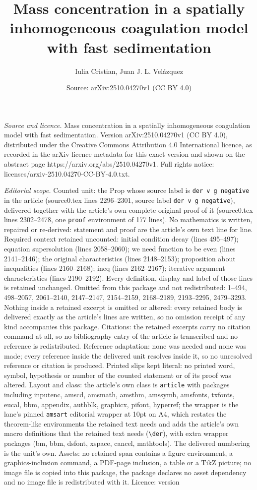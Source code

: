 \documentclass[10pt,a4paper]{amsart}
\title[Mass concentration in a spatially inhomogeneous coagulation ]{Mass concentration in a spatially inhomogeneous coagulation model with fast sedimentation}
\author{Iulia Cristian, Juan J. L. Vel\'azquez}
\date{Source: arXiv:2510.04270v1 (CC BY 4.0)}
\begin{document}
\maketitle

\noindent\emph{Source and licence.} Mass concentration in a spatially inhomogeneous coagulation model with fast sedimentation. Version arXiv:2510.04270v1 (CC BY 4.0), distributed under the Creative Commons Attribution 4.0 International licence, as recorded in the arXiv licence metadata for this exact version and shown on the abstract page https://arxiv.org/abs/2510.04270v1. Full rights notice: licenses/arxiv-2510.04270-CC-BY-4.0.txt.\par\smallskip

\noindent\textit{Editorial scope.} Counted unit: the Prop whose source label is \texttt{der v g negative} in the article (source0.tex lines 2296--2301, source label \texttt{der v g negative}), delivered together with the article's own complete original proof of it (source0.tex lines 2302--2478, one \texttt{proof} environment of 177 lines). No mathematics is written, repaired or re-derived: statement and proof are the article's own text line for line. Required context retained uncounted: initial condition decay (lines 495--497); equation supersolution (lines 2058--2060); we need function to be even (lines 2141--2146); the original characteristics (lines 2148--2153); proposition about inequalities (lines 2160--2168); ineq (lines 2162--2167); iterative argument characteristics (lines 2190--2192). Every definition, display and label of those lines is retained unchanged. Omitted from this package and not redistributed: 1--494, 498--2057, 2061--2140, 2147--2147, 2154--2159, 2168--2189, 2193--2295, 2479--3293. Nothing inside a retained excerpt is omitted or altered: every retained body is delivered exactly as the article's lines are written, so no omission receipt of any kind accompanies this package. Citations: the retained excerpts carry no citation command at all, so no bibliography entry of the article is transcribed and no reference is redistributed. Reference adaptation: none was needed and none was made; every reference inside the delivered unit resolves inside it, so no unresolved reference or citation is produced. Printed slips kept literal: no printed word, symbol, hypothesis or number of the counted statement or of its proof was altered. Layout and class: the article's own class is \texttt{article} with packages including inputenc, amscd, amsmath, amsthm, amssymb, amsfonts, txfonts, eucal, bbm, appendix, authblk, graphicx, pifont, hyperref; the wrapper is the lane's pinned \texttt{amsart} editorial wrapper at 10pt on A4, which restates the theorem-like environments the retained text needs and adds the article's own macro definitions that the retained text needs (\texttt{\textbackslash der}), with extra wrapper packages (bm, bbm, dsfont, xspace, cancel, mathtools). The delivered numbering is the unit's own. Assets: no retained span contains a figure environment, a graphics-inclusion command, a PDF-page inclusion, a table or a TikZ picture; no image file is copied into this package, the package declares no asset dependency and no image file is redistributed with it. Licence: version 
\end{document}
